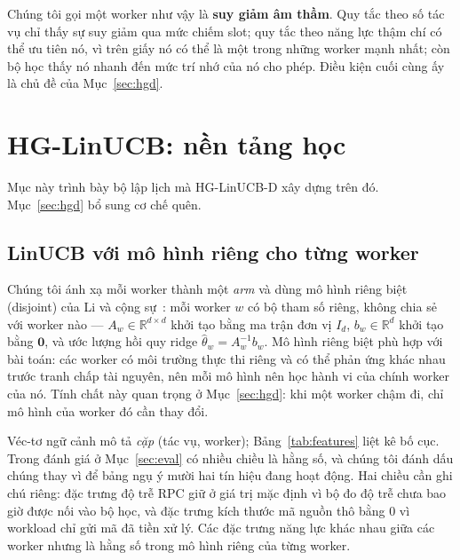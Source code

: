 \documentclass[final,5p,times,twocolumn]{elsarticle}
\begin{document}
Chúng tôi gọi một worker như vậy là \textbf{suy giảm âm thầm}. Quy tắc theo số tác vụ chỉ thấy sự suy giảm qua mức chiếm slot; quy tắc theo năng lực thậm chí có thể ưu tiên nó, vì trên giấy nó có thể là một trong những worker mạnh nhất; còn bộ học thấy nó nhanh đến mức trí nhớ của nó cho phép. Điều kiện cuối cùng ấy là chủ đề của Mục~\ref{sec:hgd}.

\section{HG-LinUCB: nền tảng học}
\label{sec:hglinucb}

Mục này trình bày bộ lập lịch mà HG-LinUCB-D xây dựng trên đó. Mục~\ref{sec:hgd} bổ sung cơ chế quên.

\subsection{LinUCB với mô hình riêng cho từng worker}

Chúng tôi ánh xạ mỗi worker thành một \emph{arm} và dùng mô hình riêng biệt (disjoint) của Li và cộng sự~\cite{li2010}: mỗi worker $w$ có bộ tham số riêng, không chia sẻ với worker nào --- $A_w\in\mathbb{R}^{d\times d}$ khởi tạo bằng ma trận đơn vị $I_d$, $b_w\in\mathbb{R}^d$ khởi tạo bằng $\mathbf{0}$, và ước lượng hồi quy ridge $\hat{\theta}_w=A_w^{-1}b_w$. Mô hình riêng biệt phù hợp với bài toán: các worker có môi trường thực thi riêng và có thể phản ứng khác nhau trước tranh chấp tài nguyên, nên mỗi mô hình nên học hành vi của chính worker của nó. Tính chất này quan trọng ở Mục~\ref{sec:hgd}: khi một worker chậm đi, chỉ mô hình của worker đó cần thay đổi.

Véc-tơ ngữ cảnh mô tả \emph{cặp} (tác vụ, worker); Bảng~\ref{tab:features} liệt kê bố cục. Trong đánh giá ở Mục~\ref{sec:eval} có nhiều chiều là hằng số, và chúng tôi đánh dấu chúng thay vì để bảng ngụ ý mười hai tín hiệu đang hoạt động. Hai chiều cần ghi chú riêng: đặc trưng độ trễ RPC giữ ở giá trị mặc định vì bộ đo độ trễ chưa bao giờ được nối vào bộ học, và đặc trưng kích thước mã nguồn thô bằng 0 vì workload chỉ gửi mã đã tiền xử lý. Các đặc trưng năng lực khác nhau giữa các worker nhưng là hằng số trong mô hình riêng của từng worker.
\end{document}
